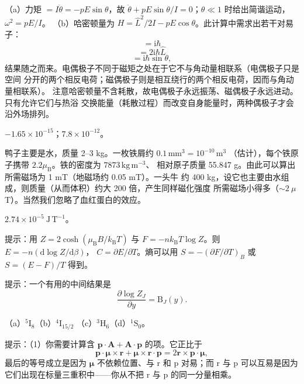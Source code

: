  （a）力矩 $=I\ddot{\theta}=-pE\sin\theta$，故
$\ddot{\theta}+pE\sin\theta/I=0$；$\theta\ll1$ 时给出简谐运动，$\omega^{2}=pE/I$。
（b）哈密顿量为 $H=\hat{L}^{2}/2I-pE\cos\theta$。此计算中需求出若干对易子：
\begin{equation*}
[\hat{\theta}, \hat{L}] = \mathrm{i}\hbar\tag{F.14}
\end{equation*}
\begin{equation*}
[\hat{\theta}, \hat{L}^{2}] = 2\mathrm{i}\hbar\hat{L}\tag{F.15}
\end{equation*}
\begin{equation*}
[\hat{L}, \cos\theta] = \mathrm{i}\hbar\sin\theta,\tag{F.16}
\end{equation*}
结果随之而来。电偶极子不同于磁矩之处在于它不与角动量相联系（电偶极子只是空间
分开的两个相反电荷；磁偶极子则是相互绕行的两个相反电荷，因而与角动量相联系）。
注意哈密顿量不含耗散，故电偶极子永远振荡、磁偶极子永远进动。只有允许它们与热浴
交换能量（耗散过程）而改变自身能量时，两种偶极子才会沿外场排列。

 $-1.65\times10^{-15}$；$7.8\times10^{-12}$。

 鸭子主要是水，质量 2--3 kg。一枚铁屑约 $0.1\,\mathrm{mm^{3}}=10^{-10}\,\mathrm{m^{3}}$
（估计），每个铁原子携带 $2.2\mu_{\mathrm{B}}$。铁的密度为 $7873\,\mathrm{kg\,m^{-3}}$、
相对原子质量 55.847 g。由此可以算出所需磁场为 1 mT（地磁场约 0.05 mT）。一头牛
约 400 kg，设它也主要由水组成，则质量（从而体积）约大 200 倍，产生同样磁化强度
所需磁场小得多（$\sim2\ \mu$T）。当然我们忽略了血红蛋白的效应。

 $2.74\times10^{-5}\ \mathrm{J\,T^{-1}}$。

 提示：用 $Z=2\cosh(\mu_{\mathrm{B}}B/k_{\mathrm{B}}T)$ 与
$F=-nk_{\mathrm{B}}T\log Z$。则 $E=-n(\mathrm{d}\log Z/\mathrm{d}\beta)$，
$C=\partial E/\partial T$。熵可以用 $S=-(\partial F/\partial T)_B$ 或
$S=(E-F)/T$ 得到。

 提示：一个有用的中间结果是
\begin{equation*}
\frac{\partial\log Z_J}{\partial y} = \mathrm{B}_J(y).\tag{F.17}
\end{equation*}

 （a）${}^{5}\mathrm{I}_8$（b）${}^{4}\mathrm{I}_{15/2}$
（c）${}^{3}\mathrm{H}_6$（d）${}^{1}\mathrm{S}_0$。

 提示：（1）你需要计算含 $\mathbf{p}\cdot\mathbf{A}+\mathbf{A}\cdot\mathbf{p}$
的项。它正比于
\begin{equation*}
\mathbf{p}\cdot\boldsymbol{\mu}\times\mathbf{r} + \boldsymbol{\mu}\times\mathbf{r}\cdot\mathbf{p} = 2\mathbf{r}\times\mathbf{p}\cdot\boldsymbol{\mu},\tag{F.18}
\end{equation*}
最后的等号成立是因为 $\boldsymbol{\mu}$ 不依赖位置、与 r 和 p 对易；而 r 与 p
可以互易是因为它们出现在标量三重积中——你从不把 r 与 p 的同一分量相乘。

